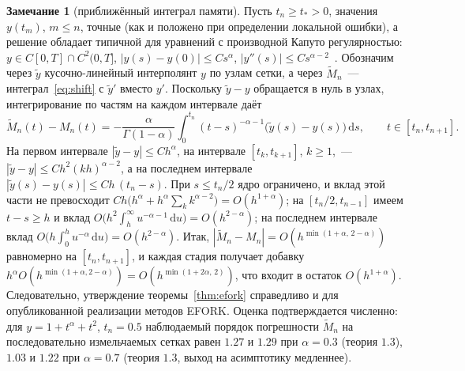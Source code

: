 \documentclass[11pt,a4paper]{article}
\theoremstyle{plain}
\theoremstyle{definition}
\newtheorem{remark}{Замечание}
\newcommand{\G}{\Gamma}
\newcommand{\dd}{\,\mathrm{d}}
\begin{document}
\begin{remark}[приближённый интеграл памяти]\label{rem:memory}
Пусть $t_n\ge t_*>0$, значения $y(t_m)$, $m\le n$, точные (как и положено при определении локальной ошибки), а решение обладает типичной для уравнений с производной Капуто регулярностью: $y\in C[0,T]\cap C^2(0,T]$, $|y(s)-y(0)|\le Cs^{\alpha}$, $|y''(s)|\le Cs^{\alpha-2}$~\cite{Brunner2004,Diethelm2010}. Обозначим через $\tilde y$ кусочно-линейный интерполянт $y$ по узлам сетки, а через $\tilde M_n$~--- интеграл~\eqref{eq:shift} с $\tilde y'$ вместо $y'$. Поскольку $\tilde y-y$ обращается в нуль в узлах, интегрирование по частям на каждом интервале даёт
\[
\tilde M_n(t)-M_n(t)=-\frac{\alpha}{\G(1-\alpha)}\int_0^{t_n}(t-s)^{-\alpha-1}\bigl(\tilde y(s)-y(s)\bigr)\dd s,\qquad t\in[t_n,t_{n+1}].
\]
На первом интервале $|\tilde y-y|\le Ch^{\alpha}$, на интервале $[t_k,t_{k+1}]$, $k\ge1$,~--- $|\tilde y-y|\le Ch^2(kh)^{\alpha-2}$, а на последнем интервале $|\tilde y(s)-y(s)|\le Ch\,(t_n-s)$. При $s\le t_n/2$ ядро ограничено, и вклад этой части не превосходит $Ch\bigl(h^{\alpha}+h^{\alpha}\sum_kk^{\alpha-2}\bigr)=O(h^{1+\alpha})$; на $[t_n/2,t_{n-1}]$ имеем $t-s\ge h$ и вклад $O\bigl(h^2\int_h^{\infty}u^{-\alpha-1}\dd u\bigr)=O(h^{2-\alpha})$; на последнем интервале вклад $O\bigl(h\int_0^h u^{-\alpha}\dd u\bigr)=O(h^{2-\alpha})$. Итак, $|\tilde M_n-M_n|=O(h^{\min(1+\alpha,\,2-\alpha)})$ равномерно на $[t_n,t_{n+1}]$, и каждая стадия получает добавку $h^{\alpha}O(h^{\min(1+\alpha,2-\alpha)})=O(h^{\min(1+2\alpha,\,2)})$, что входит в остаток $O(h^{1+\alpha})$. Следовательно, утверждение теоремы~\ref{thm:efork} справедливо и для опубликованной реализации методов EFORK. Оценка подтверждается численно: для $y=1+t^{\alpha}+t^2$, $t_n=0.5$ наблюдаемый порядок погрешности $\tilde M_n$ на последовательно измельчаемых сетках равен $1.27$ и $1.29$ при $\alpha=0.3$ (теория $1.3$), $1.03$ и $1.22$ при $\alpha=0.7$ (теория $1.3$, выход на асимптотику медленнее).
\end{remark}
\end{document}
